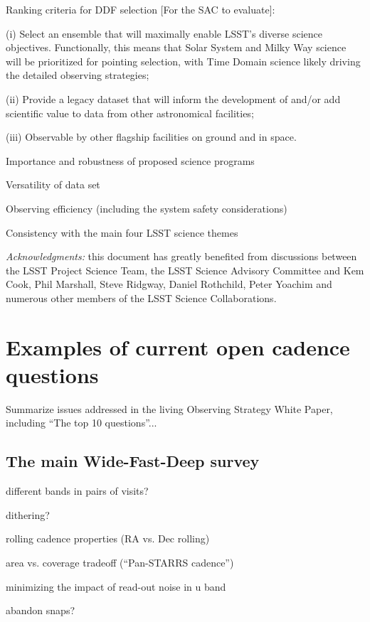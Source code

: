 \documentclass[DM,lsstdraft,toc,usenatbib]{lsstdoc}
\begin{document}
Ranking criteria for DDF selection [For the SAC to evaluate]:  

(i) Select an ensemble that will maximally enable LSST’s diverse science objectives. Functionally, this means that Solar System and Milky Way science will be prioritized for pointing selection, with Time Domain science likely driving the detailed observing strategies;  

(ii) Provide a legacy dataset that will inform the development of and/or add scientific value to data from other astronomical facilities;  

(iii) Observable by other flagship facilities on ground and in space.



Importance and robustness of proposed science programs

Versatility of data set

Observing efficiency (including the system safety considerations) 

Consistency with the main four LSST science themes 


\vskip 0.0in
\newpage
{\it Acknowledgments:} this document has greatly benefited from discussions between 
the LSST Project Science Team, the LSST Science Advisory Committee and Kem Cook, 
Phil Marshall, Steve Ridgway, Daniel Rothchild, Peter Yoachim and numerous other members 
of the LSST Science Collaborations. 

\appendix


\section{Examples of current open cadence questions} 

Summarize issues addressed in the living Observing Strategy White Paper, 
including ``The top 10 questions''... 


\subsection{The main Wide-Fast-Deep survey} 

different bands in pairs of visits?

dithering? 

rolling cadence properties (RA vs. Dec rolling) 

area vs. coverage tradeoff  (``Pan-STARRS cadence'')

minimizing the impact of read-out noise in u band

abandon snaps?
\end{document}
